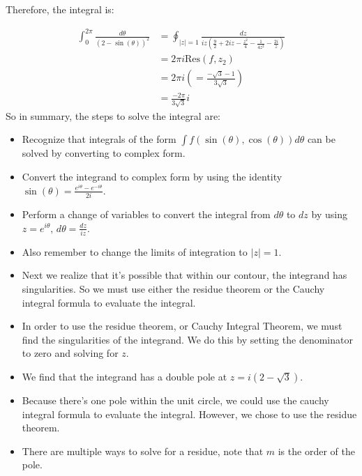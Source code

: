 \begin{example}
    Therefore, the integral is:

    \begin{align*}
        \int_0^{2\pi}\frac{d\theta}{(2-\sin(\theta))^2} & = \oint_{|z|=1} \frac{dz}{iz(\frac{9}{2} +2iz - \frac{z^2}{4} - \frac{1}{4z^2} - \frac{2i}{z})} \\
                                                        & = 2\pi i \text{Res}(f, z_2)                                                                     \\
                                                        & = 2\pi i \left( = \frac{-\sqrt{3} - 1}{3\sqrt{3}} \right)                                       \\
                                                        & = \frac{-2\pi}{3\sqrt{3}}i
    \end{align*}
    So in summary, the steps to solve the integral are:
    \begin{itemize}
        \item Recognize that integrals of the form $\int f(\sin(\theta), \cos(\theta)) d\theta$ can be solved by converting to complex form.
        \item Convert the integrand to complex form by using the identity $\sin(\theta) = \frac{e^{i\theta} - e^{-i\theta}}{2i}$.
        \item Perform a change of variables to convert the integral from $d\theta$ to $dz$ by using $z = e^{i\theta}, \, d\theta = \frac{dz}{iz}$.
        \item Also remember to change the limits of integration to $|z| = 1$.
        \item Next we realize that it's possible that within our contour, the integrand has singularities. So we must use either the residue theorem or the Cauchy integral formula to evaluate the integral.
        \item In order to use the residue theorem, or Cauchy Integral Theorem, we must find the singularities of the integrand. We do this by setting the denominator to zero and solving for $z$.
        \item We find that the integrand has a double pole at $z = i(2 - \sqrt{3})$.
        \item Because there's one pole within the unit circle, we could use the cauchy integral formula to evaluate the integral. However, we chose to use the residue theorem.
        \item There are multiple ways to solve for a residue, note that $m$ is the order of the pole.

\end{itemize}
\end{example}
